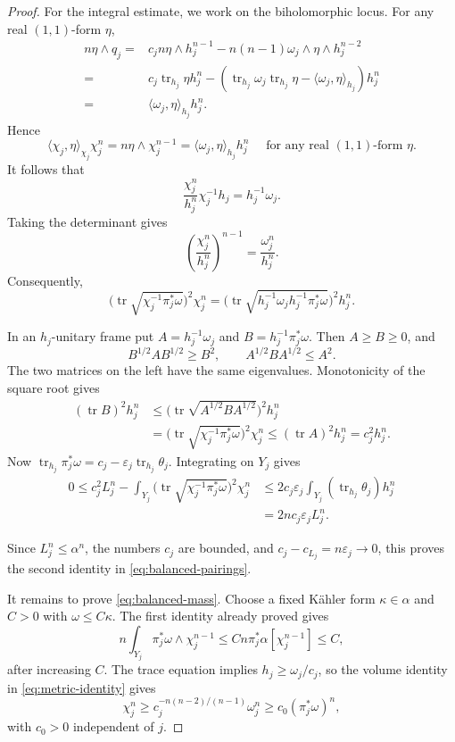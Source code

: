 \documentclass[reqno]{amsart}
\numberwithin{equation}{section}
\theoremstyle{definition}
\DeclareMathOperator{\tr}{tr}
\begin{document}
\begin{proof}
For the integral estimate, we work on the biholomorphic locus. For any real $(1,1)$-form $\eta$, \[
\begin{aligned}
    n\eta\wedge q_j=&c_j n\eta\wedge h_j^{n-1}-n(n-1)\omega_j\wedge\eta\wedge h_j^{n-2}\\
    =&c_j\tr_{h_j}\eta h_j^n-(\tr_{h_j}\omega_j\tr_{h_j}\eta-\langle \omega_j,\eta\rangle_{h_j})h_j^n\\
    =&\langle \omega_j,\eta\rangle_{h_j} h_j^n.
\end{aligned}
\]
Hence \[\langle\chi_j,\eta\rangle_{\chi_j}\chi_j^n=n\eta\wedge\chi_j^{n-1}=\langle \omega_j,\eta\rangle_{h_j}h_j^n \quad  \text{ for any real $(1,1)$-form $\eta$.}\]
It follows that 
\begin{equation}\label{eq:metric-identity}
\frac{\chi_j^n}{h_j^n}\chi_j^{-1}h_j=h_j^{-1}\omega_j.
\end{equation}
Taking the determinant gives \[
\left(\frac{\chi_j^n}{h_j^n}\right)^{n-1}=\frac{\omega_j^n}{h_j^n}.
\]
Consequently,
\[
\bigl(\tr\sqrt{\chi_j^{-1}\pi_j^*\omega}\bigr)^2\chi_j^n
=
\bigl(\tr\sqrt{h_j^{-1}\omega_j h_j^{-1}\pi^*_j\omega}\bigr)^2h_j^n.
\]

In an $h_j$-unitary frame put $A=h_j^{-1}\omega_j$ and $B=h_j^{-1}\pi_j^*\omega$. Then $A\ge B\ge0$, and
\[
 B^{1/2}AB^{1/2}\ge B^2,\qquad
 A^{1/2}BA^{1/2}\le A^2.
\]
The two matrices on the left have the same eigenvalues. Monotonicity of the square root gives
\[
 \begin{aligned}
 (\tr B)^2h_j^n
 &\le\bigl(\tr\sqrt{A^{1/2}BA^{1/2}}\bigr)^2h_j^n\\
 &=\bigl(\tr\sqrt{\chi_j^{-1}\pi_j^*\omega}\bigr)^2\chi_j^n
 \le(\tr A)^2h_j^n=c_j^2h_j^n.
 \end{aligned}
\]
Now
$\tr_{h_j}\pi_j^*\omega
=c_j-\varepsilon_j\tr_{h_j}\theta_j$.
Integrating on $Y_j$ gives
\begin{equation}\label{eq:trace-integral}
\begin{aligned}
0\le c_j^2L_j^n
 -\int_{Y_j}
  \bigl(\tr\sqrt{\chi_j^{-1}\pi_j^*\omega}\bigr)^2\chi_j^n
&\le2c_j\varepsilon_j
 \int_{Y_j}(\tr_{h_j}\theta_j)h_j^n\\
&=2nc_j\varepsilon_jL_j^n.
\end{aligned}
\end{equation}

Since $L_j^n\le\alpha^n$, the numbers $c_j$ are bounded, and
$c_j-c_{L_j}=n\varepsilon_j\to0$, this proves the second identity in
\eqref{eq:balanced-pairings}.

It remains to prove \eqref{eq:balanced-mass}.
Choose a fixed K\"ahler form $\kappa\in\alpha$ and $C>0$ with
$\omega\le C\kappa$. The first identity already proved gives
\[
n\int_{Y_j}\pi_j^*\omega\wedge \chi_j^{n-1}
\le Cn\pi_j^*\alpha[\chi_j^{n-1}]\le C,
\]
after increasing $C$.
The trace equation implies $h_j\ge\omega_j/c_j$, so the volume
identity in \eqref{eq:metric-identity} gives
\[
\chi_j^n
\ge c_j^{-n(n-2)/(n-1)}\omega_j^n
\ge c_0(\pi_j^*\omega)^n,
\]
with $c_0>0$ independent of $j$.
\end{proof}
\end{document}
